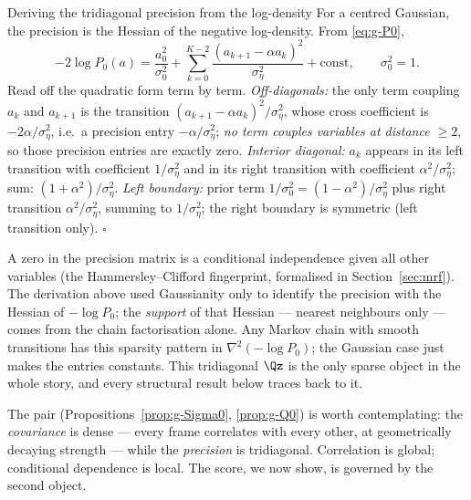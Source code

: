 \begin{toolbox}{Deriving the tridiagonal precision from the log-density}
For a centred Gaussian, the precision is the Hessian of the negative
log-density. From \eqref{eq:g-P0},
\begin{equation*}
  -2 \log P_0(a)
  = \frac{a_0^2}{\sigma_0^2}
  + \sum_{k=0}^{K-2} \frac{(a_{k+1} - \alpha a_k)^2}{\sigma_\eta^2}
  + \text{const},
  \qquad \sigma_0^2 = 1 .
\end{equation*}
Read off the quadratic form term by term.
\emph{Off-diagonals:} the only term coupling $a_k$ and $a_{k+1}$ is the
transition $(a_{k+1} - \alpha a_k)^2 / \sigma_\eta^2$, whose cross
coefficient is $-2\alpha/\sigma_\eta^2$, i.e.\ a precision entry
$-\alpha/\sigma_\eta^2$; \emph{no term couples variables at distance
$\geq 2$}, so those precision entries are exactly zero.
\emph{Interior diagonal:} $a_k$ appears in its left transition with
coefficient $1/\sigma_\eta^2$ and in its right transition with coefficient
$\alpha^2/\sigma_\eta^2$; sum: $(1+\alpha^2)/\sigma_\eta^2$.
\emph{Left boundary:} prior term $1/\sigma_0^2 = (1-\alpha^2)/\sigma_\eta^2$
plus right transition $\alpha^2/\sigma_\eta^2$, summing to
$1/\sigma_\eta^2$; the right boundary is symmetric (left transition only).
\hfill$\square$
\end{toolbox}

\begin{remark}
\label{rmk:g-markov-sparsity}
A zero in the precision matrix is a conditional independence given all other
variables (the Hammersley--Clifford fingerprint, formalised in
Section~\ref{sec:mrf}). The derivation above used Gaussianity only to
identify the precision with the Hessian of $-\log P_0$; the \emph{support}
of that Hessian --- nearest neighbours only --- comes from the chain
factorisation alone. Any Markov chain with smooth transitions has this
sparsity pattern in $\nabla^2(-\log P_0)$; the Gaussian case just makes the
entries constants. This tridiagonal $\Qz$ is the only sparse object in the
whole story, and every structural result below traces back to it.
\end{remark}

The pair (Propositions~\ref{prop:g-Sigma0}, \ref{prop:g-Q0}) is worth
contemplating: the \emph{covariance} is dense --- every frame correlates
with every other, at geometrically decaying strength --- while the
\emph{precision} is tridiagonal. Correlation is global; conditional
dependence is local. The score, we now show, is governed by the second
object.

